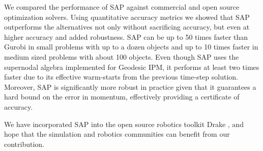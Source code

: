 We compared the performance of SAP against commercial and open source
optimization solvers. Using quantitative accuracy metrics we showed that SAP
outperforms the alternatives not only without sacrificing accuracy, but even at
higher accuracy and added robustness. SAP can be up to 50 times faster than
Gurobi in small problems with up to a dozen objects and up to 10 times faster in
medium sized problems with about 100 objects. Even though SAP uses the
supernodal algebra implemented for Geodesic IPM, it performs at least two times
faster due to its effective warm-starts from the previous time-step solution.
Moreover, SAP is significantly more robust in practice given that it guarantees
a hard bound on the error in momentum, effectively providing a certificate of
accuracy.

We have incorporated SAP into the open source robotics toolkit Drake
\cite{bib:drake}, and hope that the simulation and robotics communities can
benefit from our contribution.
